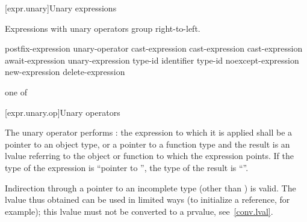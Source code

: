 [expr.unary]{Unary expressions}

\pnum
{}%
Expressions with unary operators group right-to-left.

%
%
%
%
%
\begin{bnf}
\br
    postfix-expression\br
    unary-operator cast-expression\br
    \terminal{++} cast-expression\br
    \terminal{-{-}} cast-expression\br
    await-expression\br
     unary-expression\br
     \terminal{(} type-id \terminal{)}\br
      \terminal{(} identifier \terminal{)}\br
     \terminal{(} type-id \terminal{)}\br
    noexcept-expression\br
    new-expression\br
    delete-expression
\end{bnf}

%
%
%
%
%
%
%
%
%
%
%
%
%
%
%
\begin{bnf}
 \textnormal{one of}\br
    \terminal{*  \&  +  -  !  \~}
\end{bnf}

[expr.unary.op]{Unary operators}

\pnum
{}%
%
The unary \tcode{*} operator performs :
%
the expression to which it is applied shall be a pointer to an object
type, or a pointer to a function type and the result is an lvalue
referring to the object or function to which the expression points. If
the type of the expression is ``pointer to '', the type of the
result is ``''.
\begin{note}
%
Indirection through a pointer to an incomplete type (other than
\cv{} ) is valid. The lvalue thus obtained can be
used in limited ways (to initialize a reference, for example); this
lvalue must not be converted to a prvalue, see~\ref{conv.lval}.
\end{note}

